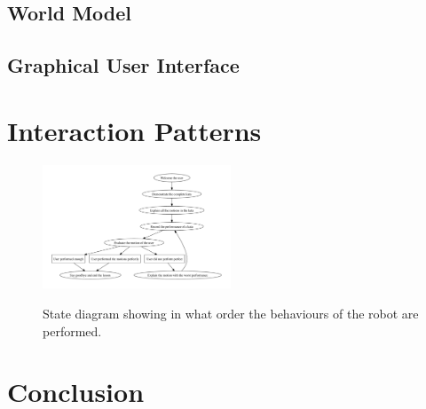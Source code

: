 \documentclass[10pt,a4paper,oneside]{scrartcl}
\begin{document}
\subsection{World Model}

\subsection{Graphical User Interface}



\section{Interaction Patterns}


\begin{figure}[!ht]
	\centering
	\includegraphics[width=0.5\textwidth]{images/stateDiagram}
	\label{fig:state-diagram}
	\caption{State diagram showing in what order the behaviours of the robot are performed.}
\end{figure}

\section{Conclusion}



\printbibliography
\end{document}

